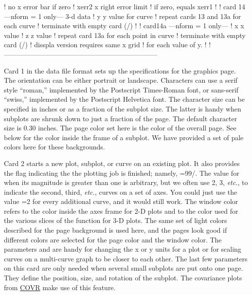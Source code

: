 \begin{ccode}
   !                    no x error bar if zero
   !     xerr2          x right error limit
   !                    if zero, equals xerr1
   !
   !   card 14   ---nform = 1 only---   3-d data
   !     y              y value for curve
   !                    repeat cards 13 and 13a for each curve
   !                    terminate with empty card (/)
   !
   !   card14a   ---nform = 1 only---
   !     x              x value
   !     z              z value
   !                    repeat card 13a for each point in curve
   !                    terminate with empty card (/)
   !                    disspla version requires same x grid
   !                    for each value of y.
   !
   !--------------------------------------------------------------------

\end{ccode}
\normalsize

Card 1 in the data file format sets up the specifications for the
graphics page.  The orientation can be either portrait or landscape.
Characters can use a serif style ``roman,'' implemented by the
Postscript Times-Roman font, or sans-serif ``swiss,'' implemented
by the Postscript Helvetica font.  The character size can be specified
in inches or as a fraction of the subplot size.  The latter is handy
when subplots are shrunk down to just a fraction of the page.  The
default character size is 0.30 inches.  The page color set here is the
color of the overall page.  See below for the color inside the frame
of a subplot.  We have provided a set of pale colors here for these
backgrounds.

Card 2 starts a new plot, subplot, or curve on an existing plot.  It
also provides the flag indicating the the plotting job is finished;
namely, =99/.  The value for  when its magnitude
is greater than one is arbitrary, but we often use 2, 3, {\it etc.},
to indicate the second, third, {\it etc.}, curves on a set of axes.
You could just use the value =2 for every additional curve,
and it would still work.  The window color  refers to
the color inside the axes frame for 2-D plots and to the color used
for the various slices of the function for 3-D plots.  The same set
of light colors described for the page background is used here, and
the pages look good if different colors are selected for the page
color and the window color.  The parameters  and
 are handy for changing the x or y units for a plot
or for scaling curves on a multi-curve graph to be closer to
each other.  The last few parameters on this card are only needed
when several small subplots are put onto one page.  They define the
position, size, and rotation of the subplot.  The covariance plots
from \hyperlink{sCOVRhy}{COVR} make use of this feature.

